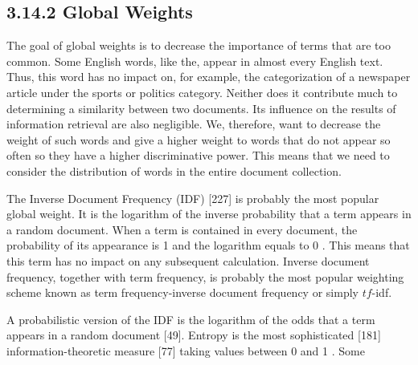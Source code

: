 \documentclass[10pt]{book}
\begin{document}
\subsection*{3.14.2 Global Weights}
The goal of global weights is to decrease the importance of terms that are too common. Some English words, like the, appear in almost every English text. Thus, this word has no impact on, for example, the categorization of a newspaper article under the sports or politics category. Neither does it contribute much to determining a similarity between two documents. Its influence on the results of information retrieval are also negligible. We, therefore, want to decrease the weight of such words and give a higher weight to words that do not appear so often so they have a higher discriminative power. This means that we need to consider the distribution of words in the entire document collection.

The Inverse Document Frequency (IDF) [227] is probably the most popular global weight. It is the logarithm of the inverse probability that a term appears in a random document. When a term is contained in every document, the probability of its appearance is 1 and the logarithm equals to 0 . This means that this term has no impact on any subsequent calculation. Inverse document frequency, together with term frequency, is probably the most popular weighting scheme known as term frequency-inverse document frequency or simply $t f$-idf.

A probabilistic version of the IDF is the logarithm of the odds that a term appears in a random document [49]. Entropy is the most sophisticated [181] information-theoretic measure [77] taking values between 0 and 1 . Some
\end{document}
